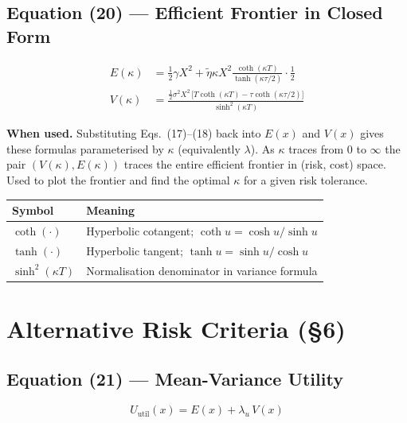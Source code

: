 \documentclass[11pt,a4paper]{article}
\begin{document}
\subsection*{Equation (20) — Efficient Frontier in Closed Form}

\begin{align}
  E(\kappa) &= \tfrac{1}{2}\gamma X^2
              + \tilde{\eta}\kappa X^2
                \frac{\coth(\kappa T)}{\tanh(\kappa\tau/2)}
                \cdot\tfrac{1}{2} \\[4pt]
  V(\kappa) &= \frac{\tfrac{1}{2}\sigma^2 X^2\,
                \bigl[T\coth(\kappa T) - \tau\coth(\kappa\tau/2)\bigr]}
               {\sinh^2(\kappa T)}
\end{align}

\textbf{When used.} Substituting Eqs.~(17)--(18) back into $E(x)$ and $V(x)$ gives these
formulas parameterised by $\kappa$ (equivalently $\lambda$).  As $\kappa$ traces from $0$
to $\infty$ the pair $(V(\kappa), E(\kappa))$ traces the entire efficient frontier in
(risk, cost) space.  Used to plot the frontier and find the optimal $\kappa$ for a given
risk tolerance.

\begin{center}
\begin{tabular}{@{}L{3.5cm}L{10cm}@{}}
\toprule
\textbf{Symbol} & \textbf{Meaning} \\
\midrule
$\coth(\cdot)$ & Hyperbolic cotangent; $\coth u = \cosh u/\sinh u$ \\
$\tanh(\cdot)$ & Hyperbolic tangent; $\tanh u = \sinh u/\cosh u$ \\
$\sinh^2(\kappa T)$ & Normalisation denominator in variance formula \\
\bottomrule
\end{tabular}
\end{center}

\section{Alternative Risk Criteria (\texorpdfstring{\S}{§}6)}

\subsection*{Equation (21) — Mean-Variance Utility}

\begin{equation}
  U_{\mathrm{util}}(x) = E(x) + \lambda_u\,V(x)
\end{equation}
\end{document}
